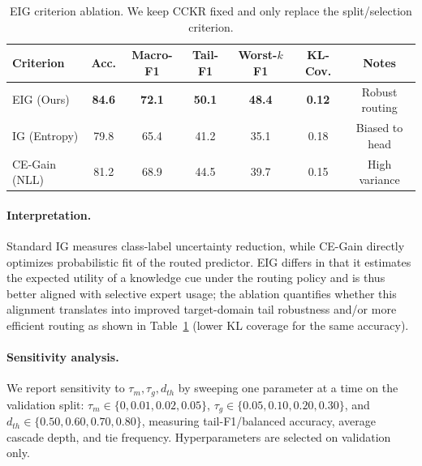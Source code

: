 \documentclass{article}
\begin{document}
\vspace{12pt} %

\begin{table}[h]
\centering
\small
\caption{EIG criterion ablation. We keep CCKR fixed and only replace the split/selection criterion.} 
\label{tab:eig_ablation}
\vspace{12pt} %

\setlength{\tabcolsep}{8pt}
\begin{tabular}{l ccc ccc}
\toprule
Criterion & Acc. & Macro-F1 & Tail-F1 & Worst-$k$ F1 & KL-Cov. & Notes \\
\midrule
EIG (Ours)      & \textbf{84.6} & \textbf{72.1} & \textbf{50.1} & \textbf{48.4} & \textbf{0.12} & Robust routing \\
IG (Entropy)    & 79.8 & 65.4 & 41.2 & 35.1 & 0.18 & Biased to head \\
CE-Gain (NLL)   & 81.2 & 68.9 & 44.5 & 39.7 & 0.15 & High variance \\
\bottomrule
\end{tabular}
\end{table}

\vspace{12pt} %
 
\paragraph{Interpretation.}
Standard IG measures class-label uncertainty reduction, while CE-Gain directly optimizes probabilistic fit of the routed
predictor. EIG differs in that it estimates the expected utility of a knowledge cue under the routing policy and is thus
better aligned with selective expert usage; the ablation quantifies whether this alignment translates into improved
target-domain tail robustness and/or more efficient routing as shown in Table~\ref{tab:eig_ablation} (lower KL coverage for the same accuracy).
\paragraph{Sensitivity analysis.}
We report sensitivity to $\tau_m,\tau_g,d_{th}$ by sweeping one parameter at a time on the validation split:
$\tau_m\in\{0,0.01,0.02,0.05\}$, $\tau_g\in\{0.05,0.10,0.20,0.30\}$, and $d_{th}\in\{0.50,0.60,0.70,0.80\}$,
measuring tail-F1/balanced accuracy, average cascade depth, and tie frequency. Hyperparameters are selected on validation only.
\newpage
\end{document}
